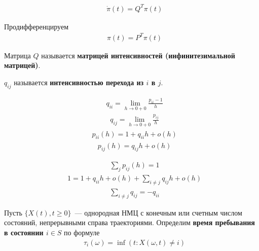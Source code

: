 \begin{Prop}
    \begin{align*}
      & \dot{\pi}(t) = Q^T\pi(t)
    \end{align*}
\end{Prop}
\begin{Proof}
    Продифференцируем
    \begin{align*}
      & \pi(t) = P^T\pi(t)
    \end{align*}  
\end{Proof}
\begin{Def}
    Матрица $Q$ называется \textbf{матрицей интенсивностей (инфинитезимальной матрицей)}.
\end{Def}
\begin{Def}
    $q_{ij}$ называется \textbf{интенсивностью перехода из $i$ в $j$}.
\end{Def}
\begin{Prop}
    \begin{align*}
      & q_{ii} = \lim_{h \to 0+0}\frac{p_{ii}-1}{h}
    \end{align*}
    \begin{align*}
      & q_{ij} = \lim_{h \to 0+0}\frac{p_{ij}}{h}
    \end{align*}
    \begin{align*}
      & p_{ii}(h) = 1 + q_{ii}h + o(h)
    \end{align*}
    \begin{align*}
      & p_{ij}(h) = q_{ij}h + o(h)
    \end{align*}
\end{Prop}
\begin{Proof}
    \begin{align*}
      & \sum_{j}p_{ij}(h) = 1
    \end{align*}
    \begin{align*}
      & 1 = 1+q_{ii}h+o(h)+\sum_{i\neq j}q_{ij}h+o(h)
    \end{align*}
    \begin{align*}
      & \sum_{i\neq j}q_{ij} = -q_{ii}
    \end{align*}    
\end{Proof}
\begin{Def}
Пусть $\{X(t), t \geq 0\}$~--- однородная НМЦ с конечным или счетным числом
состояний, непрерывными справа траекториями. Определим \textbf{время пребывания
  в состоянии $i \in S$} по формуле
\begin{align*}
  & \tau_i(\omega) = \inf\left( t: X(\omega, t) \neq i \right)
\end{align*}
\end{Def}
